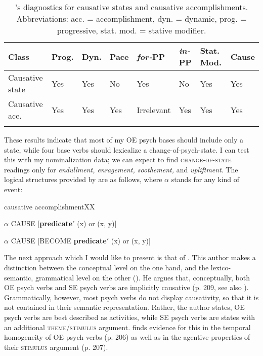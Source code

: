 \begin{table}
	\small
		\caption[\citeauthor{VanValin.2005}'s diagnostics for causative states and causative accomplishments]{\label{tab:psych-Valintests} \citeauthor{VanValin.2005}'s diagnostics for causative states and causative accomplishments. Abbreviations: acc. = accomplishment, dyn. = dynamic, prog. = progressive, stat. mod. = stative modifier.} 
		\begin{tabular} {llllllll}
 			\lsptoprule
			Class & Prog. & Dyn. & Pace & \textit{for-}PP & \textit{in-}PP & Stat. Mod. & Cause \\
			\midrule
			Causative state & Yes & Yes & No & Yes & No & Yes & Yes \\
			Causative acc. & Yes & Yes & Yes & Irrelevant & Yes & Yes & Yes\\
			\lspbottomrule
		\end{tabular}
\end{table} 

These results indicate that most of my OE psych bases should include only a state, while four base verbs should lexicalize a change-of-psych-state. I can test this with my nominalization data; we can expect to find \textsc{change-of-state} readings only for \textit{endullment, enragement, soothement,} and \textit{upliftment}. The logical structures provided by \citet[45]{VanValin.2005} are as follows, where $\alpha$ stands for any kind of event:

\begin{labeling}{causative accomplishmentXX}
	\item [causative state] $\alpha$ CAUSE [\textbf{predicate$'$} (x) or (x, y)]
	\item [causative accomplishment] $\alpha$ CAUSE [BECOME \textbf{predicate$'$} (x) or (x, y)]
\end{labeling}

The next approach which I would like to present is that of \citet{Hartl.1999,Hartl.2001book,Hartl.2001}. This author makes a distinction between the conceptual level on the one hand, and the lexico-semantic, grammatical level on the other (\citealt[206]{Hartl.2001}). 
He argues that, conceptually, both OE psych verbs and SE psych verbs are implicitly causative (p. 209, see also ).  
Grammatically, however, most psych verbs do not display causativity, so that it is not contained in their semantic representation. Rather, the author states, OE psych verbs are best described as activities, while SE psych verbs are states with an additional \textsc{theme/stimulus} argument. \citet{Hartl.2001} finds evidence for this in the temporal homogeneity of OE psych verbs (p. 206) as well as in the agentive properties of their \textsc{stimulus} argument (p. 207). 

